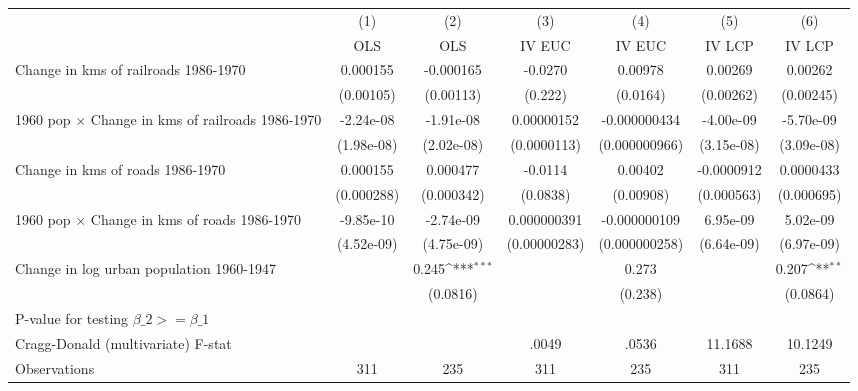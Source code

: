 {
\def\sym#1{\ifmmode^{#1}\else\(^{#1}\)\fi}
\begin{tabular}{l*{6}{c}}
\hline\hline
                &\multicolumn{1}{c}{(1)}&\multicolumn{1}{c}{(2)}&\multicolumn{1}{c}{(3)}&\multicolumn{1}{c}{(4)}&\multicolumn{1}{c}{(5)}&\multicolumn{1}{c}{(6)}\\
                &\multicolumn{1}{c}{OLS}&\multicolumn{1}{c}{OLS}&\multicolumn{1}{c}{IV EUC}&\multicolumn{1}{c}{IV EUC}&\multicolumn{1}{c}{IV LCP}&\multicolumn{1}{c}{IV LCP}\\
\hline
Change in kms of railroads 1986-1970& 0.000155         &-0.000165         &  -0.0270         &  0.00978         &  0.00269         &  0.00262         \\
                &(0.00105)         &(0.00113)         &  (0.222)         & (0.0164)         &(0.00262)         &(0.00245)         \\
[1em]
1960 pop $\times$ Change in kms of railroads 1986-1970&-2.24e-08         &-1.91e-08         &0.00000152         &-0.000000434         &-4.00e-09         &-5.70e-09         \\
                &(1.98e-08)         &(2.02e-08)         &(0.0000113)         &(0.000000966)         &(3.15e-08)         &(3.09e-08)         \\
[1em]
Change in kms of roads 1986-1970& 0.000155         & 0.000477         &  -0.0114         &  0.00402         &-0.0000912         &0.0000433         \\
                &(0.000288)         &(0.000342)         & (0.0838)         &(0.00908)         &(0.000563)         &(0.000695)         \\
[1em]
1960 pop $\times$ Change in kms of roads 1986-1970&-9.85e-10         &-2.74e-09         &0.000000391         &-0.000000109         & 6.95e-09         & 5.02e-09         \\
                &(4.52e-09)         &(4.75e-09)         &(0.00000283)         &(0.000000258)         &(6.64e-09)         &(6.97e-09)         \\
[1em]
Change in log urban population 1960-1947&                  &    0.245\sym{***}&                  &    0.273         &                  &    0.207\sym{**} \\
                &                  & (0.0816)         &                  &  (0.238)         &                  & (0.0864)         \\
\hline
P-value for testing $\beta\_{2} >= \beta\_{1}$&                  &                  &                  &                  &                  &                  \\
Cragg-Donald (multivariate) F-stat&                  &                  &    .0049         &    .0536         &  11.1688         &  10.1249         \\
Observations    &      311         &      235         &      311         &      235         &      311         &      235         \\
\hline\hline
\end{tabular}
}
